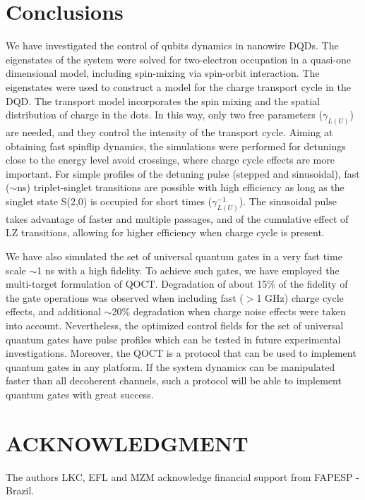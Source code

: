 \documentclass[prb,twocolumn,showpacs,floats]{revtex4}
\begin{document}
\section{Conclusions}

We have investigated the control of qubits dynamics in nanowire DQDs.
The eigenstates of the system were solved for two-electron occupation in a quasi-one dimensional
model, including spin-mixing via spin-orbit interaction. The eigenstates were
used to construct a model for the charge transport cycle in the DQD. The transport model 
incorporates the spin mixing and the spatial distribution of charge in the dots.
In this way, only two free parameters ($\gamma_{L(U)}$) are needed, and they control the
intensity of the transport cycle. Aiming at obtaining fast spinflip dynamics, the simulations 
were performed for detunings close to the energy level avoid crossings, 
where charge cycle effects are more important. For simple profiles of the detuning pulse
(stepped and sinusoidal), fast ($\sim$ns) triplet-singlet
transitions are possible with high efficiency as long as the singlet state S(2,0) is occupied
for short times ($\gamma_{L(U)}^{-1}$). The sinusoidal pulse takes advantage of faster and multiple passages,
and of the cumulative effect of LZ transitions, allowing for higher efficiency when charge cycle is 
present.

We have also simulated the set of universal quantum gates in a very fast time scale $\sim$1 ns with a high fidelity. To achieve such gates, we have employed the multi-target formulation 
of QOCT.
Degradation of about 15\% of the fidelity of the gate operations was observed 
when including fast ($>$1 GHz) charge cycle effects, and additional $\sim$20\% degradation
when charge noise effects were taken into account. Nevertheless, the optimized control fields for the set of universal quantum gates have pulse profiles
which can be tested in future experimental investigations. Moreover, the QOCT is a protocol that can be used to implement quantum gates in any platform. If the system dynamics can be manipulated faster than all decoherent channels, such a protocol will be able to implement quantum gates with great success.



\section*{ACKNOWLEDGMENT}

The authors LKC, EFL and MZM acknowledge financial support from 
FAPESP - Brazil.
\end{document}
